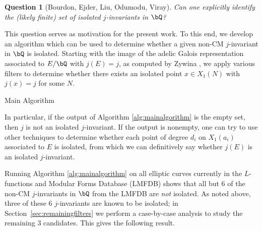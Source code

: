 \documentclass[11pt,reqno]{amsart}
\theoremstyle{plain}
\newtheorem{theorem}{Theorem}%
\newtheorem{question}[theorem]{Question}
\theoremstyle{definition}
\newcommand{\Q}{\bQ}
\begin{document}
\begin{question}[Bourdon, Ejder, Liu, Odumodu, Viray]
    Can one explicitly identify the (likely finite) set of isolated $j$-invariants in $\Q$?
\end{question}



This question serves as motivation for the present work. To this end, we develop an algorithm which can be used to determine whether a given non-CM $j$-invariant in $\Q$ is isolated. Starting with the image of the adelic Galois representation associated to $E/\Q$ with $j(E)=j$, as computed by Zywina \cite{ZywinaAlgorithm}, we apply various filters to determine whether there exists an isolated point $x \in X_1(N)$ with $j(x)=j$ for some $N$.

\begin{algorithm}[h!]
\caption{Main Algorithm} 
    \KwIn{A non-CM $j$-invariant $j \in \Q$.}
\end{algorithm}

\noindent
In particular, if the output of Algorithm \ref{alg:mainalgorithm} is the empty set, then $j$ is not an isolated $j$-invariant.
If the output is nonempty,
one can try to use other techniques to determine whether each point of degree $d_i$ on $X_1(a_i)$ associated to $E$ is isolated, from which we can definitively say whether $j(E)$ is an isolated $j$-invariant.

Running Algorithm \ref{alg:mainalgorithm} on all elliptic curves currently in the $L$-functions and Modular Forms Database (LMFDB) \cite{LMFDB} shows that all but 6 of the non-CM $j$-invariants in $\Q$ from the LMFDB
are \emph{not} isolated. As noted above, three of these $6$ $j$-invariants are known to be isolated; in Section~\ref{sec:remainingfilters} we perform a case-by-case analysis to study the remaining $3$ candidates. This gives the following result.
\end{document}
